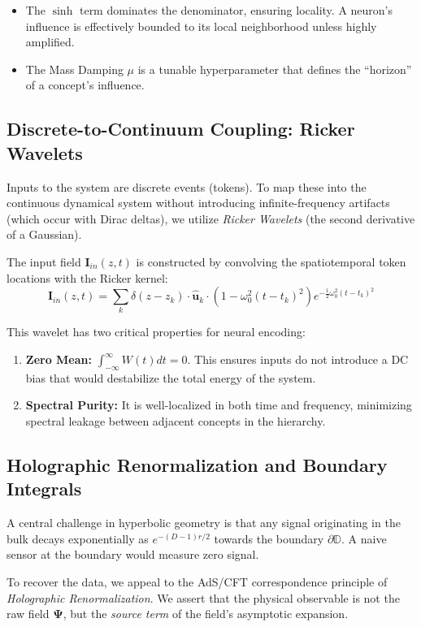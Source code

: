 \documentclass{article}
\newcommand{\boundary}{\partial \mathbb{D}}
\begin{document}
\begin{itemize}
    \item The $\sinh$ term dominates the denominator, ensuring locality. A neuron's influence is effectively bounded to its local neighborhood unless highly amplified.
    \item The Mass Damping $\mu$ is a tunable hyperparameter that defines the ``horizon'' of a concept's influence.
\end{itemize}

\subsection{Discrete-to-Continuum Coupling: Ricker Wavelets}
Inputs to the system are discrete events (tokens). To map these into the continuous dynamical system without introducing infinite-frequency artifacts (which occur with Dirac deltas), we utilize \textit{Ricker Wavelets} (the second derivative of a Gaussian).

The input field $\mathbf{I}_{in}(z, t)$ is constructed by convolving the spatiotemporal token locations with the Ricker kernel:
\begin{equation}
    \mathbf{I}_{in}(z, t) = \sum_{k} \delta(z - z_k) \cdot \mathbf{\hat{u}}_k \cdot \left( 1 - \omega_0^2 (t - t_k)^2 \right) e^{-\frac{1}{2}\omega_0^2 (t - t_k)^2}
\end{equation}

This wavelet has two critical properties for neural encoding:
\begin{enumerate}
    \item \textbf{Zero Mean:} $\int_{-\infty}^{\infty} W(t) dt = 0$. This ensures inputs do not introduce a DC bias that would destabilize the total energy of the system.
    \item \textbf{Spectral Purity:} It is well-localized in both time and frequency, minimizing spectral leakage between adjacent concepts in the hierarchy.
\end{enumerate}

\subsection{Holographic Renormalization and Boundary Integrals}
A central challenge in hyperbolic geometry is that any signal originating in the bulk decays exponentially as $e^{-(D-1)r/2}$ towards the boundary $\boundary$. A naive sensor at the boundary would measure zero signal.

To recover the data, we appeal to the AdS/CFT correspondence principle of \textit{Holographic Renormalization}. We assert that the physical observable is not the raw field $\mathbf{\Psi}$, but the \textit{source term} of the field's asymptotic expansion.
\end{document}
